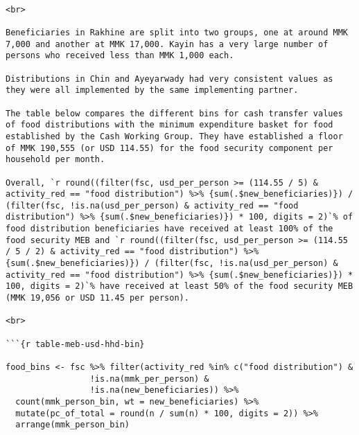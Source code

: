 \documentclass[
]{article}
\begin{document}
\begin{verbatim}

<br>

Beneficiaries in Rakhine are split into two groups, one at around MMK 7,000 and another at MMK 17,000. Kayin has a very large number of persons who received less than MMK 1,000 each. 

Distributions in Chin and Ayeyarwady had very consistent values as they were all implemented by the same implementing partner.

The table below compares the different bins for cash transfer values of food distributions with the minimum expenditure basket for food established by the Cash Working Group. They have established a floor of MMK 190,555 (or USD 114.55) for the food security component per household per month. 

Overall, `r round((filter(fsc, usd_per_person >= (114.55 / 5) & activity_red == "food distribution") %>% {sum(.$new_beneficiaries)}) / (filter(fsc, !is.na(usd_per_person) & activity_red == "food distribution") %>% {sum(.$new_beneficiaries)}) * 100, digits = 2)`% of food distribution beneficiaries have received at least 100% of the food security MEB and `r round((filter(fsc, usd_per_person >= (114.55 / 5 / 2) & activity_red == "food distribution") %>% {sum(.$new_beneficiaries)}) / (filter(fsc, !is.na(usd_per_person) & activity_red == "food distribution") %>% {sum(.$new_beneficiaries)}) * 100, digits = 2)`% have received at least 50% of the food security MEB (MMK 19,056 or USD 11.45 per person).

<br>

```{r table-meb-usd-hhd-bin}

food_bins <- fsc %>% filter(activity_red %in% c("food distribution") & 
                 !is.na(mmk_per_person) & 
                 !is.na(new_beneficiaries)) %>% 
  count(mmk_person_bin, wt = new_beneficiaries) %>% 
  mutate(pc_of_total = round(n / sum(n) * 100, digits = 2)) %>% 
  arrange(mmk_person_bin)


\end{verbatim}
\end{document}
